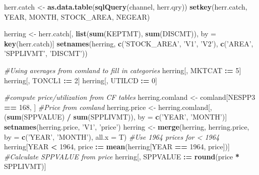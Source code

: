 \documentclass[]{article}
\newenvironment{Shaded}{\begin{snugshade}}{\end{snugshade}}
\newcommand{\KeywordTok}[1]{\textcolor[rgb]{0.13,0.29,0.53}{\textbf{#1}}}
\newcommand{\DataTypeTok}[1]{\textcolor[rgb]{0.13,0.29,0.53}{#1}}
\newcommand{\DecValTok}[1]{\textcolor[rgb]{0.00,0.00,0.81}{#1}}
\newcommand{\StringTok}[1]{\textcolor[rgb]{0.31,0.60,0.02}{#1}}
\newcommand{\CommentTok}[1]{\textcolor[rgb]{0.56,0.35,0.01}{\textit{#1}}}
\newcommand{\OperatorTok}[1]{\textcolor[rgb]{0.81,0.36,0.00}{\textbf{#1}}}
\newcommand{\ErrorTok}[1]{\textcolor[rgb]{0.64,0.00,0.00}{\textbf{#1}}}
\newcommand{\NormalTok}[1]{#1}
\begin{document}
\begin{Shaded}
\begin{Highlighting}[]
{{{{{{\NormalTok{herr.catch <-}\StringTok{ }\KeywordTok{as.data.table}\NormalTok{(}\KeywordTok{sqlQuery}\NormalTok{(channel, herr.qry))}
\KeywordTok{setkey}\NormalTok{(herr.catch, YEAR, MONTH, STOCK_AREA, NEGEAR)}

\NormalTok{herring <-}\StringTok{ }\NormalTok{herr.catch[, }\KeywordTok{list}\NormalTok{(}\KeywordTok{sum}\NormalTok{(KEPTMT), }\KeywordTok{sum}\NormalTok{(DISCMT)), by =}\StringTok{ }\KeywordTok{key}\NormalTok{(herr.catch)]}
\KeywordTok{setnames}\NormalTok{(herring, }\KeywordTok{c}\NormalTok{(}\StringTok{'STOCK_AREA'}\NormalTok{, }\StringTok{'V1'}\NormalTok{, }\StringTok{'V2'}\NormalTok{),}
                  \KeywordTok{c}\NormalTok{(}\StringTok{'AREA'}\NormalTok{, }\StringTok{'SPPLIVMT'}\NormalTok{, }\StringTok{'DISCMT'}\NormalTok{))}

\CommentTok{#Using averages from comland to fill in categories}
\NormalTok{herring[, MKTCAT }\OperatorTok{:}\ErrorTok{=}\StringTok{ }\DecValTok{5}\NormalTok{]}
\NormalTok{herring[, TONCL1 }\OperatorTok{:}\ErrorTok{=}\StringTok{ }\DecValTok{2}\NormalTok{]}
\NormalTok{herring[, UTILCD }\OperatorTok{:}\ErrorTok{=}\StringTok{ }\DecValTok{0}\NormalTok{]}

\CommentTok{#compute price/utilization from CF tables}
\NormalTok{herring.comland <-}\StringTok{ }\NormalTok{comland[NESPP3 }\OperatorTok{==}\StringTok{ }\DecValTok{168}\NormalTok{, ]}
\CommentTok{#Price from comland}
\NormalTok{herring.price <-}\StringTok{ }\NormalTok{herring.comland[, (}\KeywordTok{sum}\NormalTok{(SPPVALUE) }\OperatorTok{/}\StringTok{ }\KeywordTok{sum}\NormalTok{(SPPLIVMT)), by =}\StringTok{ }\KeywordTok{c}\NormalTok{(}\StringTok{'YEAR'}\NormalTok{, }\StringTok{'MONTH'}\NormalTok{)]}
\KeywordTok{setnames}\NormalTok{(herring.price, }\StringTok{'V1'}\NormalTok{, }\StringTok{'price'}\NormalTok{)}
\NormalTok{herring <-}\StringTok{ }\KeywordTok{merge}\NormalTok{(herring, herring.price, }\DataTypeTok{by =} \KeywordTok{c}\NormalTok{(}\StringTok{'YEAR'}\NormalTok{, }\StringTok{'MONTH'}\NormalTok{), }\DataTypeTok{all.x =}\NormalTok{ T)}
\CommentTok{#Use 1964 prices for < 1964}
\NormalTok{herring[YEAR }\OperatorTok{<}\StringTok{ }\DecValTok{1964}\NormalTok{, price }\OperatorTok{:}\ErrorTok{=}\StringTok{ }\KeywordTok{mean}\NormalTok{(herring[YEAR }\OperatorTok{==}\StringTok{ }\DecValTok{1964}\NormalTok{, price])]}
\CommentTok{#Calculate SPPVALUE from price}
\NormalTok{herring[, SPPVALUE }\OperatorTok{:}\ErrorTok{=}\StringTok{ }\KeywordTok{round}\NormalTok{(price }\OperatorTok{*}\StringTok{ }\NormalTok{SPPLIVMT)]}

}}}}}}
\end{Highlighting}
\end{Shaded}
\end{document}
